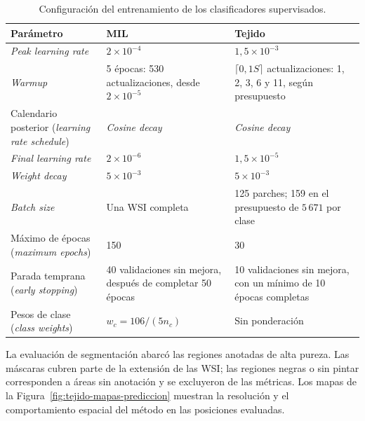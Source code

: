 \begin{table}[htbp]
    \centering
    \caption{Configuración del entrenamiento de los clasificadores supervisados.}
    \label{tab:entrenamiento-supervisado}
    \small
    \begin{tabularx}{\textwidth}{@{}>{\raggedright\arraybackslash}p{}XX@{}}
        \toprule
        Parámetro & MIL & Tejido \\
        \midrule
        \emph{Peak learning rate} &
        \(2\times10^{-4}\) & \(1,5\times10^{-3}\) \\
        \addlinespace
        \emph{Warmup} &
        5 épocas: 530 actualizaciones, desde \(2\times10^{-5}\) &
        \(\lceil0,1S\rceil\) actualizaciones: 1, 2, 3, 6 y 11, según presupuesto \\
        \addlinespace
        Calendario posterior (\emph{learning rate schedule}) &
        \emph{Cosine decay} &
        \emph{Cosine decay} \\
        \addlinespace
        \emph{Final learning rate} &
        \(2\times10^{-6}\) & \(1,5\times10^{-5}\) \\
        \addlinespace
        \emph{Weight decay} &
        \(5\times10^{-3}\) & \(5\times10^{-3}\) \\
        \addlinespace
        \emph{Batch size} &
        Una WSI completa &
        125 parches; 159 en el presupuesto de \(5\,671\) por clase \\
        \addlinespace
        Máximo de épocas (\emph{maximum epochs}) & 150 & 30 \\
        \addlinespace
        Parada temprana (\emph{early stopping}) &
        40 validaciones sin mejora, después de completar 50 épocas &
        10 validaciones sin mejora, con un mínimo de 10 épocas completas \\
        \addlinespace
        Pesos de clase (\emph{class weights}) &
        \(w_c=106/(5n_c)\) & Sin ponderación \\
        \bottomrule
    \end{tabularx}
\end{table}
\FloatBarrier

La evaluación de segmentación abarcó las regiones anotadas de alta pureza.
Las máscaras cubren parte de la extensión de las WSI; las regiones negras o
sin pintar corresponden a áreas sin anotación y se excluyeron de las métricas.
Los mapas de la Figura~\ref{fig:tejido-mapas-prediccion} muestran la resolución
y el comportamiento espacial del método en las posiciones evaluadas.

